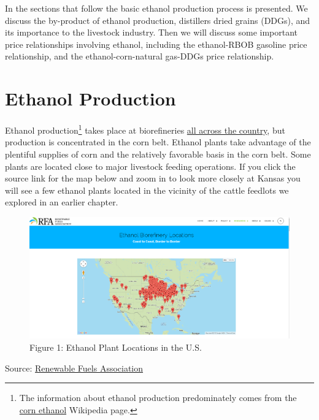 \documentclass[
  letterpaper,
  DIV=11,
  numbers=noendperiod]{scrreprt}
\begin{document}
In the sections that follow the basic ethanol production process is
presented. We discuss the by-product of ethanol production, distillers
dried grains (DDGs), and its importance to the livestock industry. Then
we will discuss some important price relationships involving ethanol,
including the ethanol-RBOB gasoline price relationship, and the
ethanol-corn-natural gas-DDGs price relationship.

\hypertarget{ethanol-production}{%
\section{Ethanol Production}\label{ethanol-production}}

Ethanol production\footnote{The information about ethanol production
  predominately comes from the
  \href{https://en.wikipedia.org/wiki/Corn_ethanol}{corn ethanol}
  Wikipedia page.} takes place at biorefineries
\href{http://www.ethanolrfa.org/resources/biorefinery-locations/}{all
across the country}, but production is concentrated in the corn belt.
Ethanol plants take advantage of the plentiful supplies of corn and the
relatively favorable basis in the corn belt. Some plants are located
close to major livestock feeding operations. If you click the source
link for the map below and zoom in to look more closely at Kansas you
will see a few ethanol plants located in the vicinity of the cattle
feedlots we explored in an earlier chapter.

\begin{figure}

{\centering \includegraphics{images/eth_locations.png}

}

\caption{Figure 1: Ethanol Plant Locations in the U.S.}

\end{figure}

Source:
\href{http://www.ethanolrfa.org/resources/biorefinery-locations/}{Renewable
Fuels Association}
\end{document}

